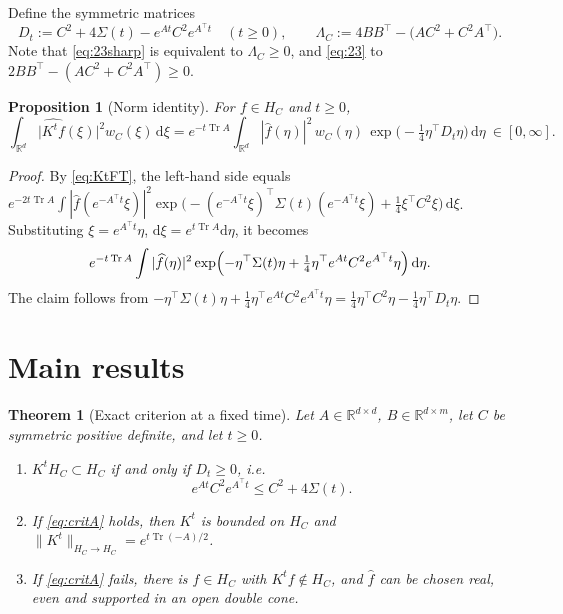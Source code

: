 \documentclass[11pt]{article}
\newtheorem{theorem}{Theorem}
\newtheorem{proposition}[lemma]{Proposition}
\theoremstyle{definition}
\theoremstyle{remark}
\newcommand{\R}{\mathbb{R}}
\newcommand{\Tr}{\operatorname{Tr}}
\newcommand{\dd}{\,\mathrm{d}}
\newcommand{\hatf}[1]{\widehat{#1}}
\newcommand{\tp}{\top}
\begin{document}
Define the symmetric matrices
\begin{equation}\label{eq:Dt}
D_t:=C^2+4\Sigma(t)-e^{At}C^2e^{A^\tp t}\quad(t\ge0),\qquad
\Lambda_C:=4BB^\tp-\bigl(AC^2+C^2A^\tp\bigr).
\end{equation}
Note that \eqref{eq:23sharp} is equivalent to $\Lambda_C\ge0$, and \eqref{eq:23} to $2BB^\tp-(AC^2+C^2A^\tp)\ge0$.

\begin{proposition}[Norm identity]\label{prop:norm}
For $f\in H_C$ and $t\ge0$,
\begin{equation}\label{eq:normid}
\int_{\R^d}\bigl|\hatf{K^tf}(\xi)\bigr|^2w_C(\xi)\dd\xi
=e^{-t\Tr A}\int_{\R^d}|\hatf f(\eta)|^2\,w_C(\eta)\,\exp\bigl(-\tfrac14\eta^\tp D_t\eta\bigr)\dd\eta\ \in[0,\infty].
\end{equation}
\end{proposition}

\begin{proof}
By \eqref{eq:KtFT}, the left-hand side equals
$e^{-2t\Tr A}\int|\hatf f(e^{-A^\tp t}\xi)|^2\exp\bigl(-(e^{-A^\tp t}\xi)^\tp\Sigma(t)(e^{-A^\tp t}\xi)+\frac14\xi^\tp C^2\xi\bigr)\dd\xi$.
Substituting $\xi=e^{A^\tp t}\eta$, $\mathrm d\xi=e^{t\Tr A}\mathrm d\eta$, it becomes
\[
e^{-t\Tr A}\int|\hatf f(\eta)|^2\exp\Bigl(-\eta^\tp\Sigma(t)\eta+\tfrac14\eta^\tp e^{At}C^2e^{A^\tp t}\eta\Bigr)\dd\eta .
\]
The claim follows from
$-\eta^\tp\Sigma(t)\eta+\frac14\eta^\tp e^{At}C^2e^{A^\tp t}\eta=\frac14\eta^\tp C^2\eta-\frac14\eta^\tp D_t\eta$.
\end{proof}

\section{Main results}\label{sec:main}

\begin{theorem}[Exact criterion at a fixed time]\label{thm:A}
Let $A\in\R^{d\times d}$, $B\in\R^{d\times m}$, let $C$ be symmetric positive definite, and let $t\ge0$.
\begin{enumerate}
\item[(a)] $K^tH_C\subset H_C$ if and only if $D_t\ge0$, i.e.
\begin{equation}\label{eq:critA}
e^{At}C^2e^{A^\tp t}\le C^2+4\Sigma(t).
\end{equation}
\item[(b)] If \eqref{eq:critA} holds, then $K^t$ is bounded on $H_C$ and $\|K^t\|_{H_C\to H_C}=e^{t\Tr(-A)/2}$.
\item[(c)] If \eqref{eq:critA} fails, there is $f\in H_C$ with $K^tf\notin H_C$, and $\hatf f$ can be chosen real,
even and supported in an open double cone.
\end{enumerate}
\end{theorem}
\end{document}
